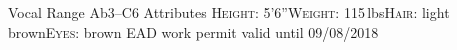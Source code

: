 \begin{cvskills}
  \cvskill
    {Vocal Range}%
    {Ab3--C6}%
  \cvskill
    {Attributes}%
    {{\scshape Height}: 5'6''{\enskip\cdotp\enskip}{\scshape Weight}: 115\,lbs{\enskip\cdotp\enskip}{\scshape Hair}: light brown{\enskip\cdotp\enskip}{\scshape Eyes}: brown}%
  \cvskill
    {EAD}
    {work permit valid until 09/08/2018}
\end{cvskills}
